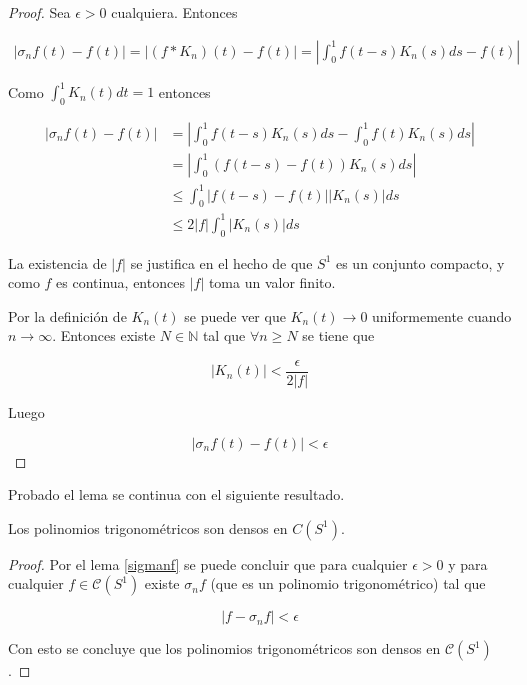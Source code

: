 \begin{proof}
	Sea $\epsilon >0$ cualquiera. Entonces
	
	\begin{multline}
		|\sigma_n f(t) - f(t)| = \left| (f * K_n)(t) - f(t)  \right| = \left| \int_{0}^{1} f(t-s) K_n(s) ds - f(t) \right|
	\end{multline}
	
	Como $\int_{0}^{1} K_n(t)dt = 1$ entonces
	
	\begin{align}
		|\sigma_n f(t) - f(t)| &= \left| \int_{0}^{1} f(t-s) K_n(s)ds - \int_{0}^{1} f(t) K_n(s)ds \right|\\
		&= \left| \int_{0}^{1} (f(t-s)-f(t)) K_n(s)ds \right|\\
		&\leq \int_{0}^{1} | f(t-s)-f(t) | |K_n(s)| ds\\
		&\leq 2|f| \int_{0}^{1} |K_n(s)|ds
	\end{align}
	
	La existencia de $|f|$ se justifica en el hecho de que $S^1$ es un conjunto compacto, y como $f$ es continua, entonces $|f|$ toma un valor finito.
	
	Por la definición de $K_n(t)$ se puede ver que $K_n(t) \rightarrow 0$ uniformemente cuando $n \rightarrow \infty$. Entonces existe $N \in \mathbb{N}$ tal que $\forall n \geq N$ se tiene que
	
	\begin{equation}
		|K_n(t)| < \frac{\epsilon}{2|f|}
	\end{equation}
	
	Luego
	
	\begin{equation}
		|\sigma_n f(t) - f(t)| < \epsilon
	\end{equation}
\end{proof}

Probado el lema se continua con el siguiente resultado.

\begin{teorema}
	Los polinomios trigonométricos son densos en $C(S^1)$.
\end{teorema}

\begin{proof}
	Por el lema \ref{sigmanf} se puede concluir que para cualquier $\epsilon > 0$ y para cualquier $f \in \mathcal{C}(S^1)$ existe $\sigma_n f$ (que es un polinomio trigonométrico) tal que
	
	\begin{equation}
		|f - \sigma_n f| < \epsilon
	\end{equation}
	
	Con esto se concluye que los polinomios trigonométricos son densos en $\mathcal{C}(S^1)$.
\end{proof}